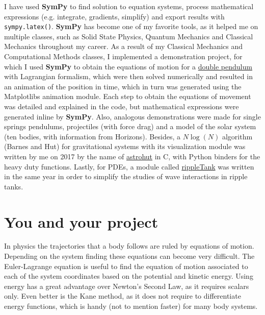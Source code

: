 \documentclass[12pt]{article}
\newcommand{\sympy}{\textbf{SymPy}}
\begin{document}
\newpage

I have used \sympy{} to find solution to equation systems, process mathematical expressions (e.g. integrate, gradients, simplify) and export results with \texttt{sympy.latex()}. \sympy{} has become one of my favorite tools, as it helped me on multiple classes, such as Solid State Physics, Quantum Mechanics and Classical Mechanics throughout my career. As a result of my Classical Mechanics and Computational Methods classes, I implemented a demonstration project, for which I used \sympy{} to obtain the equations of motion for a \href{https://github.com/ComputoCienciasUniandes/Demonstrations/tree/master/DoublePendulum}{double pendulum} with Lagrangian formalism, which were then solved numerically and resulted in an animation of the position in time, which in turn was generated using the Matplotlibs animation module. Each step to obtain the equations of movement was detailed and explained in the code, but mathematical expressions were generated inline by \sympy{}. Also, analogous demonstrations were made for single springs pendulums, projectiles (with force drag) and a model of the solar system (ten bodies, with information from Horizons). Besides, a $N\log(N)$ algorithm (Barnes and Hut) for gravitational systems with its visualization module was written by me on 2017 by the name of \href{https://jsbarbosa.github.io/astrohut/}{astrohut} in C, with Python binders for the heavy duty functions. Lastly, for PDEs, a module called \href{https://jsbarbosa.github.io/rippleTank/}{rippleTank} was written in the same year in order to simplify the studies of wave interactions in ripple tanks.  

\section{You and your project}
In physics the trajectories that a body follows are ruled by equations of motion. Depending on the system finding these equations can become very difficult. The Euler-Lagrange equation is useful to find the equation of motion associated to each of the system coordinates based on the potential and kinetic energy. Using energy has a great advantage over Newton's Second Law, as it requires scalars only. Even better is the Kane method, as it does not require to differentiate energy functions, which is handy (not to mention faster) for many body systems.
\end{document}
